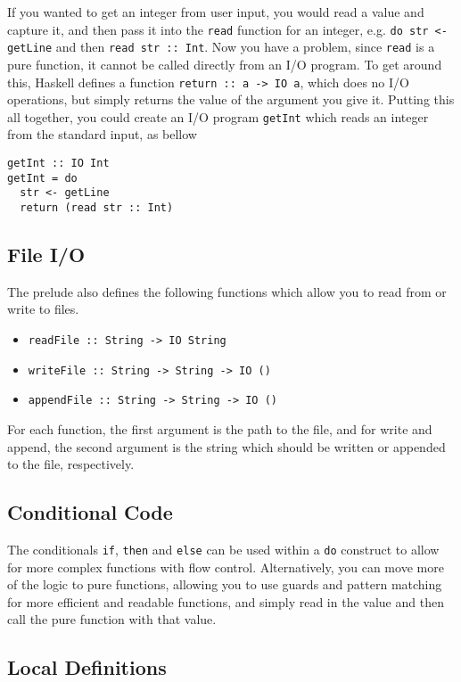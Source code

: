 If you wanted to get an integer from user input, you would read a value and capture it, and then pass it into the
 \verb`read` function for an integer, e.g. \verb`do str <- getLine` and then \verb`read str :: Int`. Now you have a
 problem, since \verb`read` is a pure function, it cannot be called directly from an I/O program. To get around this,
 Haskell defines a function \verb`return :: a -> IO a`, which does no I/O operations, but simply returns the value of
 the argument you give it. Putting this all together, you could create an I/O program \verb`getInt` which reads an
 integer from the standard input, as bellow
\begin{verbatim}
getInt :: IO Int
getInt = do
  str <- getLine
  return (read str :: Int)
\end{verbatim}

\subsection*{File I/O}

The prelude also defines the following functions which allow you to read from or write to files.
\begin{itemize}
  \item \verb`readFile :: String -> IO String`
  \item \verb`writeFile :: String -> String -> IO ()`
  \item \verb`appendFile :: String -> String -> IO ()`
\end{itemize}
For each function, the first argument is the path to the file, and for write and append, the second argument is the
 string which should be written or appended to the file, respectively.

\subsection*{Conditional Code}

The conditionals \verb`if`, \verb`then` and \verb`else` can be used within a \verb`do` construct to allow for more
 complex functions with flow control. Alternatively, you can move more of the logic to pure functions, allowing you to
 use guards and pattern matching for more efficient and readable functions, and simply read in the value and then call
 the pure function with that value.

\subsection*{Local Definitions}

